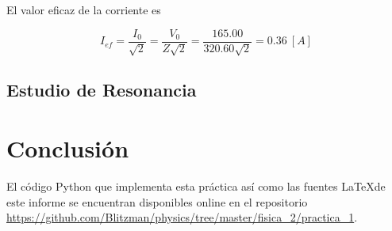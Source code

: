 \documentclass[journal]{IEEEtran}
\begin{document}
El valor eficaz de la corriente es

\begin{equation}
I_{ef} = \frac{I_0}{\sqrt{2}} = \frac{V_0}{Z\sqrt{2}} = \frac{165.00}{320.60\sqrt{2}} = 0.36~[A]
\end{equation}

\subsection{Estudio de Resonancia}
\label{subsec:estudioresonancia}

\section{Conclusión}
\label{sec:conclusion}

\clearpage

El código Python que implementa esta práctica así como las fuentes \LaTeX de este informe se encuentran disponibles online en el repositorio \url{https://github.com/Blitzman/physics/tree/master/fisica_2/practica_1}.
\end{document}
